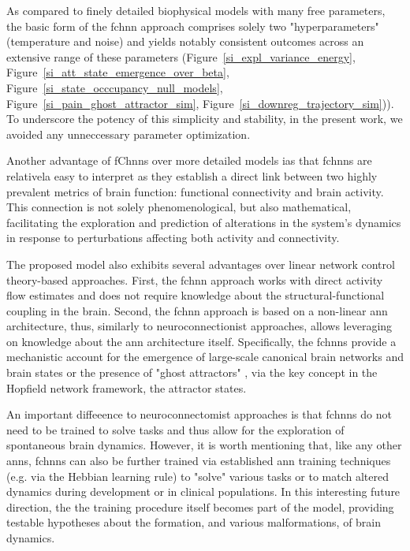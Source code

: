 \documentclass{article}
\begin{document}
As compared to finely detailed biophysical models with many free parameters, the basic form of the \acrshort{fchnn} approach comprises solely two "hyperparameters" (temperature and noise) and yields notably consistent outcomes across an extensive range of these parameters (Figure~\ref{si_expl_variance_energy}, Figure~\ref{si_att_state_emergence_over_beta}, Figure~\ref{si_state_occcupancy_null_models}, Figure~\ref{si_pain_ghost_attractor_sim}, Figure~\ref{si_downreg_trajectory_sim})). To underscore the potency of this simplicity and stability, in the present work, we avoided any unneccessary parameter optimization.

Another advantage of fC\acrshort{hnn}s over more detailed models ias that \acrshort{fchnn}s are relativela easy to interpret as they establish a direct link between two highly prevalent metrics of brain function: functional connectivity and brain activity. This connection is not solely phenomenological, but also mathematical, facilitating the exploration and prediction of alterations in the system's dynamics in response to perturbations affecting both activity and connectivity.

The proposed model also exhibits several advantages over linear network control theory-based \citep{gu2015controllability} approaches. First, the \acrshort{fchnn} approach works with direct activity flow estimates and does not require knowledge about the structural-functional coupling in the brain. Second, the \acrshort{fchnn} approach is based on a non-linear \acrshort{ann} architecture, thus, similarly to neuroconnectionist approaches, allows leveraging on knowledge about the \acrshort{ann} architecture itself. Specifically, the \acrshort{fchnn}s provide a mechanistic account for the emergence of large-scale canonical brain networks \citep{zalesky2014time} and brain states or the presence of "ghost attractors" \citep{vohryzek2020ghost}, via the key concept in the Hopfield network framework, the attractor states.

An important diffeeence to neuroconnectomist approaches is that \acrshort{fchnn}s do not need to be trained to solve tasks and thus allow for the exploration of spontaneous brain dynamics. However, it is worth mentioning that, like any other \acrshort{ann}s, \acrshort{fchnn}s can also be further trained via established \acrshort{ann} training techniques (e.g. via the Hebbian learning rule) to "solve" various tasks or to match altered dynamics during development or in clinical populations. In this interesting future direction, the the training procedure itself becomes part of the model, providing testable hypotheses about the formation, and various malformations, of brain dynamics.
\end{document}
